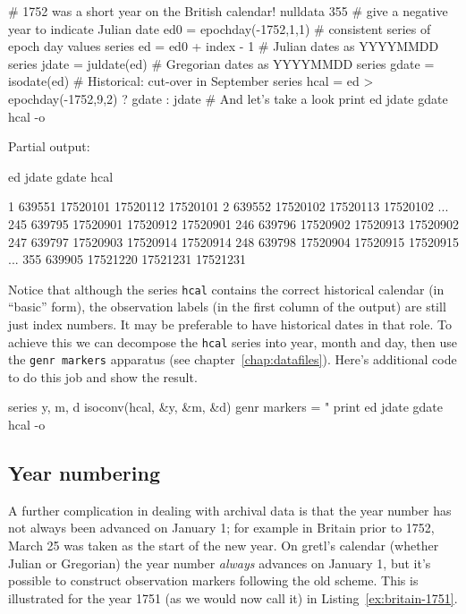 \begin{script}[htbp]
\begin{scodebit}
# 1752 was a short year on the British calendar!
nulldata 355
# give a negative year to indicate Julian date
ed0 = epochday(-1752,1,1)
# consistent series of epoch day values
series ed = ed0 + index - 1
# Julian dates as YYYYMMDD
series jdate = juldate(ed)
# Gregorian dates as YYYYMMDD
series gdate = isodate(ed)
# Historical: cut-over in September
series hcal = ed > epochday(-1752,9,2) ? gdate : jdate
# And let's take a look
print ed jdate gdate hcal -o
\end{scodebit}
  
Partial output:
\begin{outbit}
              ed        jdate        gdate         hcal

  1       639551     17520101     17520112     17520101
  2       639552     17520102     17520113     17520102
...
245       639795     17520901     17520912     17520901
246       639796     17520902     17520913     17520902
247       639797     17520903     17520914     17520914
248       639798     17520904     17520915     17520915
...
355       639905     17521220     17521231     17521231
\end{outbit}
\end{script}

Notice that although the series \texttt{hcal} contains the correct
historical calendar (in ``basic'' form), the observation labels (in
the first column of the output) are still just index numbers. It may
be preferable to have historical dates in that role. To achieve this
we can decompose the \texttt{hcal} series into year, month and day,
then use the \texttt{genr markers} apparatus (see
chapter~\ref{chap:datafiles}). Here's additional code to do this job
and show the result.
\begin{code}
series y, m, d
isoconv(hcal, &y, &m, &d)
genr markers = "%
print ed jdate gdate hcal -o
\end{code}

\subsection{Year numbering}
\label{sec:cal-yearnum}

A further complication in dealing with archival data is that the year
number has not always been advanced on January 1; for example in
Britain prior to 1752, March 25 was taken as the start of the new
year. On gretl's calendar (whether Julian or Gregorian) the year
number \textit{always} advances on January 1, but it's possible to
construct observation markers following the old scheme. This is
illustrated for the year 1751 (as we would now call it) in
Listing~\ref{ex:britain-1751}.

